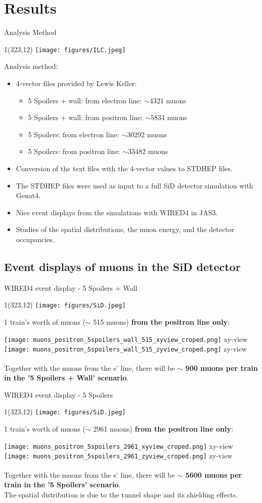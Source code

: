 \documentclass[xcolor={dvipsnames}]{beamer}
\newcommand{\sidlogo}{
  \setlength{\TPHorizModule}{1pt}
  \setlength{\TPVertModule}{1pt}
  \begin{textblock}{1}(323,12)
   \texttt{[image: figures/SiD.jpeg]}
  \end{textblock}
  }
\newcommand{\ilclogo}{
  \setlength{\TPHorizModule}{1pt}
  \setlength{\TPVertModule}{1pt}
  \begin{textblock}{1}(323,12)
   \texttt{[image: figures/ILC.jpeg]}
  \end{textblock}
}
\begin{document}
\section{Results}
\begin{frame}{Analysis Method}
\ilclogo
Analysis method:
\begin{itemize}
\item 4-vector files provided by Lewis Keller:
\begin{itemize}
 \item 5 Spoilers + wall: from electron line: $\sim$4321 muons
 \item 5 Spoilers + wall: from positron line: $\sim$5834 muons
 \item 5 Spoilers: from electron line: $\sim$30292 muons
 \item 5 Spoilers: from positron line: $\sim$33482 muons
\end{itemize}
\item Conversion of the text files with the 4-vector values to  STDHEP files.
\item The STDHEP files were used as input to a full SiD detector simulation with Genat4.
\item Nice event displays from the simulations with WIRED4 in JAS3.
\item Studies of the spatial distributions, the muon energy, and the detector occupancies.
\end{itemize}

\end{frame}

\subsection{Event displays of muons in the SiD detector}
\begin{frame}{WIRED4 event display - 5 Spoilers + Wall}
\sidlogo
1 train's worth of muons ($\sim$ 515 muons) \textbf{from the positron line only}:
\begin{center}
\texttt{[image: muons\_positron\_5spoilers\_wall\_515\_xyview\_croped.png]}
{\tiny xy-view}
\texttt{[image: muons\_positron\_5spoilers\_wall\_515\_zyview\_croped.png]}
{\tiny zy-view}
\end{center}
Together with the muons from the e\textsuperscript{-} line, there will be \textbf{$\sim$ 900 muons per train in the '5 Spoilers + Wall' scenario}.
\end{frame}
\begin{frame}{WIRED4 event display - 5 Spoilers}
\sidlogo
1 train's worth of muons ($\sim$ 2961 muons) \textbf{from the positron line only}:
\begin{center}
\texttt{[image: muons\_positron\_5spoilers\_2961\_xyview\_croped.png]}
{\tiny xy-view}
\texttt{[image: muons\_positron\_5spoilers\_2961\_zyview\_croped.png]}
{\tiny zy-view}
\end{center}
Together with the muons from the e\textsuperscript{-} line, there will be \textbf{$\sim$ 5600 muons per train in the '5 Spoilers' scenario}.\\
The spatial distribution is due to the tunnel shape and its shielding effects.
\end{frame}
\end{document}
